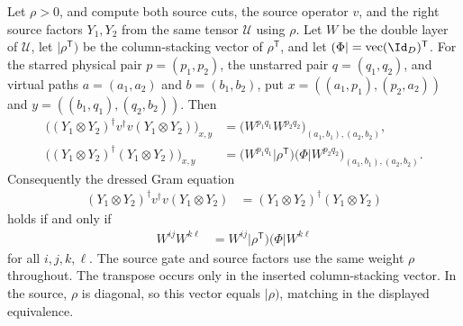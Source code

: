 \begin{lemma}
    \label{thm:mpu_source_v_complete_contraction}
    \leanok
    Let $\rho>0$, and compute both source cuts, the source operator $v$, and
    the right source factors $Y_1,Y_2$ from the same tensor $\mathcal U$ using
    $\rho$. Let $W$ be the double layer of $\mathcal U$, let
    $\lvert\rho^{\mathsf T})$ be the column-stacking vector of
    $\rho^{\mathsf T}$, and let
    $(\Phi\rvert=\operatorname{vec}(\Id_D)^{\mathsf T}$. For the starred
    physical pair $p=(p_1,p_2)$, the unstarred pair $q=(q_1,q_2)$, and
    virtual paths $a=(a_1,a_2)$ and $b=(b_1,b_2)$, put
    $x=((a_1,p_1),(p_2,a_2))$ and $y=((b_1,q_1),(q_2,b_2))$. Then
    \begin{align}
        \bigl((Y_1\otimes Y_2)^\dagger v^\dagger v(Y_1\otimes Y_2)\bigr)_{x,y}
         & =\bigl(W^{p_1q_1}W^{p_2q_2}\bigr)_{(a_1,b_1),(a_2,b_2)},
        \label{eq:mpu_source_v_dressed_two_letter}                              \\
        \bigl((Y_1\otimes Y_2)^\dagger(Y_1\otimes Y_2)\bigr)_{x,y}
         & =\bigl(W^{p_1q_1}\lvert\rho^{\mathsf T})(\Phi\rvert W^{p_2q_2}\bigr)
        _{(a_1,b_1),(a_2,b_2)}.
        \label{eq:mpu_source_v_undressed_inserted}
    \end{align}
    Consequently the dressed Gram equation
    \begin{align}
        (Y_1\otimes Y_2)^\dagger v^\dagger v(Y_1\otimes Y_2)
         & =(Y_1\otimes Y_2)^\dagger(Y_1\otimes Y_2)
    \end{align}
    holds if and only if
    \begin{align}
        W^{ij}W^{k\ell}
         & =W^{ij}\lvert\rho^{\mathsf T})(\Phi\rvert W^{k\ell}
    \end{align}
    for all $i,j,k,\ell$. The source gate and source factors use the same
    weight $\rho$ throughout. The transpose occurs only in the inserted
    column-stacking vector. In the source, $\rho$ is diagonal, so this vector
    equals $\lvert\rho)$, matching in \cite[equation~\texttt{vUnitary} and proof of Theorem~III.8]{Cirac2017MPU} the displayed
    equivalence.
\end{lemma}

